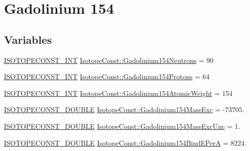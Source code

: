 \hypertarget{group___isotope_const-_gadolinium-_gd154}{}\section{Gadolinium 154}
\label{group___isotope_const-_gadolinium-_gd154}
\subsection*{Variables}
\begin{DoxyCompactItemize}
\item 
\mbox{\hyperlink{group___isotope_const-_macros_ga5f18360b3e99483a35c32d789e62621c}{I\+S\+O\+T\+O\+P\+E\+C\+O\+N\+S\+T\+\_\+\+I\+NT}} \mbox{\hyperlink{group___isotope_const-_gadolinium-_gd154_ga6f581e58bd79852c8562ca54c6fb79e9}{Isotope\+Const\+::\+Gadolinium154\+Neutrons}} = 90
\item 
\mbox{\hyperlink{group___isotope_const-_macros_ga5f18360b3e99483a35c32d789e62621c}{I\+S\+O\+T\+O\+P\+E\+C\+O\+N\+S\+T\+\_\+\+I\+NT}} \mbox{\hyperlink{group___isotope_const-_gadolinium-_gd154_ga5947b2ec1ad1e1ed9261c68c5398921d}{Isotope\+Const\+::\+Gadolinium154\+Protons}} = 64
\item 
\mbox{\hyperlink{group___isotope_const-_macros_ga5f18360b3e99483a35c32d789e62621c}{I\+S\+O\+T\+O\+P\+E\+C\+O\+N\+S\+T\+\_\+\+I\+NT}} \mbox{\hyperlink{group___isotope_const-_gadolinium-_gd154_ga7a22d6f3e6250ab78bdf47b6815646f6}{Isotope\+Const\+::\+Gadolinium154\+Atomic\+Weight}} = 154
\item 
\mbox{\hyperlink{group___isotope_const-_macros_ga8f45a7272ce02c0b4c65c44636ed719a}{I\+S\+O\+T\+O\+P\+E\+C\+O\+N\+S\+T\+\_\+\+D\+O\+U\+B\+LE}} \mbox{\hyperlink{group___isotope_const-_gadolinium-_gd154_gae682ca2283a894a0e39d93b7993897c0}{Isotope\+Const\+::\+Gadolinium154\+Mass\+Exc}} = -\/73705.
\item 
\mbox{\hyperlink{group___isotope_const-_macros_ga8f45a7272ce02c0b4c65c44636ed719a}{I\+S\+O\+T\+O\+P\+E\+C\+O\+N\+S\+T\+\_\+\+D\+O\+U\+B\+LE}} \mbox{\hyperlink{group___isotope_const-_gadolinium-_gd154_ga17df328adfa3e700771470af3e8cc2bb}{Isotope\+Const\+::\+Gadolinium154\+Mass\+Exc\+Unc}} = 1.
\item 
\mbox{\hyperlink{group___isotope_const-_macros_ga8f45a7272ce02c0b4c65c44636ed719a}{I\+S\+O\+T\+O\+P\+E\+C\+O\+N\+S\+T\+\_\+\+D\+O\+U\+B\+LE}} \mbox{\hyperlink{group___isotope_const-_gadolinium-_gd154_gacedc4a69afa3499172dec206e4e7039f}{Isotope\+Const\+::\+Gadolinium154\+Bind\+E\+PerA}} = 8224.

\end{DoxyCompactItemize}
